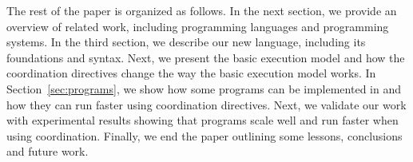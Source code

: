 The rest of the paper is organized as follows. In the next section, we provide an overview of related work, including
programming languages and programming systems. In the third section, we describe our new language, including its foundations and syntax.
Next, we present the basic execution model and how the coordination directives change the way the basic execution model works.
In Section~\ref{sec:programs}, we show how some programs can be implemented in \lang and how they can run faster using coordination directives.
Next, we validate our work with experimental results showing that \lang programs scale well and run faster when using coordination.
Finally, we end the paper outlining some lessons, conclusions and future work.
